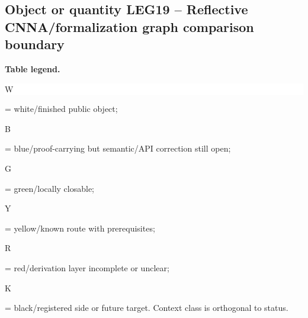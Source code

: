 \subsection*{Object or quantity LEG19 -- Reflective CNNA/\allowbreak{}formalization graph comparison boundary}
\hypertarget{objproof:LEG19}{}
\par\smallskip\noindent\begin{minipage}{0.99\linewidth}\footnotesize\raggedright\textbf{Table legend.} \colorbox{white}{\strut W} = white/finished public object; \colorbox{cyan!20}{\strut B} = blue/proof-carrying but semantic/API correction still open; \colorbox{green!18}{\strut G} = green/locally closable; \colorbox{yellow!25}{\strut Y} = yellow/known route with prerequisites; \colorbox{red!20}{\strut R} = red/derivation layer incomplete or unclear; \colorbox{black!18}{\strut K} = black/registered side or future target. Context class is orthogonal to status.\end{minipage}\par\vspace{0.25em}
